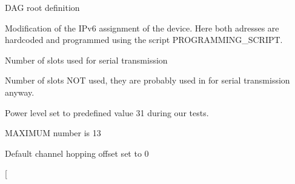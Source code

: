 
\begin{DoxyRefList}
\item[\label{_l_k_n_code_edits__LKN_code_edits000002}%
\hypertarget{_l_k_n_code_edits__LKN_code_edits000002}{}%
Member \hyperlink{opendefs_8h_af6aaa0374ba3a63d8cac6f5396583f49}{D\+A\+G\+R\+O\+OT} ]D\+AG root definition  
\item[\label{_l_k_n_code_edits__LKN_code_edits000011}%
\hypertarget{_l_k_n_code_edits__LKN_code_edits000011}{}%
Member \hyperlink{group___i_d_manager_ga3e974443ae75269d00c3de03992a1669}{idmanager\+\_\+init} (void)]Modification of the I\+Pv6 assignment of the device. Here both adresses are hardcoded and programmed using the script P\+R\+O\+G\+R\+A\+M\+M\+I\+N\+G\+\_\+\+S\+C\+R\+I\+PT.  
\item[\label{_l_k_n_code_edits__LKN_code_edits000006}%
\hypertarget{_l_k_n_code_edits__LKN_code_edits000006}{}%
Member \hyperlink{group___schedule_ga5206eabfac75eeed6f5066fb6d00f7c3}{N\+U\+M\+S\+E\+R\+I\+A\+L\+RX} ]Number of slots used for serial transmission  
\item[\label{_l_k_n_code_edits__LKN_code_edits000007}%
\hypertarget{_l_k_n_code_edits__LKN_code_edits000007}{}%
Member \hyperlink{group___schedule_ga9fd457940c2d1313fb347b5fd32d2105}{N\+U\+M\+S\+L\+O\+T\+S\+O\+FF} ]Number of slots N\+OT used, they are probably used in for serial transmission anyway.  
\item[\label{_l_k_n_code_edits__LKN_code_edits000001}%
\hypertarget{_l_k_n_code_edits__LKN_code_edits000001}{}%
Member \hyperlink{group__radio_gaf181029cf06b94f0f4ceaafec1c3f209}{radio\+\_\+reset} (void)]Power level set to predefined value 31 during our tests.  
\item[\label{_l_k_n_code_edits__LKN_code_edits000008}%
\hypertarget{_l_k_n_code_edits__LKN_code_edits000008}{}%
Member \hyperlink{group___schedule_ga299d7e29eb70888b68ace83fd3f1a8df}{S\+C\+H\+E\+D\+U\+L\+E\+\_\+\+M\+I\+N\+I\+M\+A\+L\+\_\+6\+T\+I\+S\+C\+H\+\_\+\+A\+C\+T\+I\+V\+E\+\_\+\+C\+E\+L\+LS} ]M\+A\+X\+I\+M\+UM number is 13  
\item[\label{_l_k_n_code_edits__LKN_code_edits000010}%
\hypertarget{_l_k_n_code_edits__LKN_code_edits000010}{}%
Member \hyperlink{group___schedule_ga485a603a3e03059901c4fc5fc968a1e9}{S\+C\+H\+E\+D\+U\+L\+E\+\_\+\+M\+I\+N\+I\+M\+A\+L\+\_\+6\+T\+I\+S\+C\+H\+\_\+\+C\+H\+A\+N\+N\+E\+L\+O\+F\+F\+S\+ET} ]Default channel hopping offset set to 0  
\item[\label{_l_k_n_code_edits__LKN_code_edits000009}%
\hypertarget{_l_k_n_code_edits__LKN_code_edits000009}{}%

\end{DoxyRefList}

